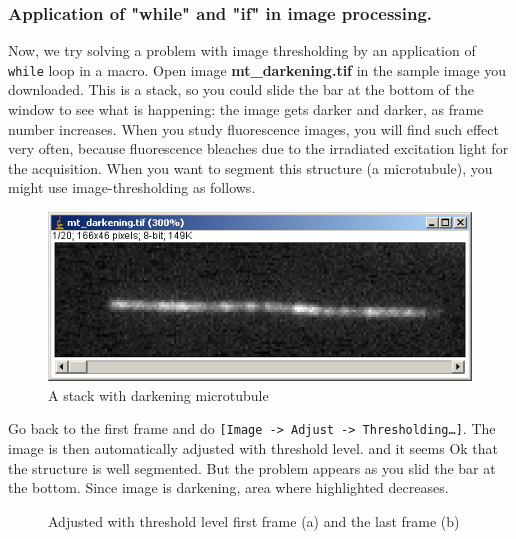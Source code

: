 \documentclass[11pt,a4paper,oneside]{report}
\newcommand{\ijmenu}[1]{\texttt{\small#1}}
\newcommand{\ilcom}[1]{\texttt{\small#1}}
\begin{document}
\subsubsection{Application of "while" and "if" in image processing.}
Now, we try solving a problem with image thresholding by an application of \ilcom{while} loop in a macro. Open image \textbf{mt\_darkening.tif} in the sample image you downloaded. This is a stack, so you could slide the bar at the bottom of the window to see what is happening: the image gets darker and darker, as frame number increases. When you study fluorescence images, you will find such effect very often, because fluorescence bleaches due to the irradiated excitation light for the acquisition. When you want to segment this structure (a microtubule), you might use image-thresholding as follows. 

\begin{figure}[htbp]
\begin{center}
\includegraphics[scale=0.6]{fig/fig23441_mtStack.png}
\caption{A stack with darkening microtubule}
\label{fig:MTstack}
\end{center}
\end{figure} 

Go back to the first frame and do \ijmenu{[Image -> Adjust -> Thresholding\ldots]}. The image is then automatically adjusted with threshold level. and it seems Ok that the structure is well segmented. But the problem appears as you slid the bar at the bottom. Since image is darkening, area where highlighted decreases. 

\begin{figure}[htbp]
 \centering
 \caption{Adjusted with threshold level first frame (a) and the last frame (b)}
 \label{fig:degradingThreshold}
\end{figure}
\end{document}
